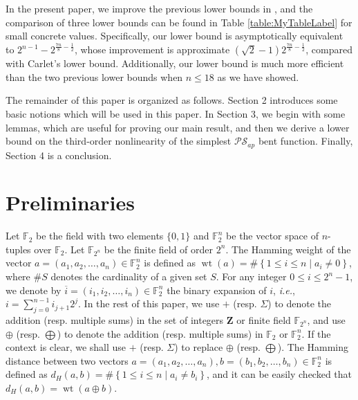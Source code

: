 \documentclass{article}
\newcommand{\Z}{\mathbf{Z}}
\newcommand{\F}{\mathbb{F}}
\newcommand{\0}{\textbf{0}}
\newcommand{\1}{\textbf{1}}
\newcommand{\wt}{\operatorname{wt}}
\theoremstyle{plain}
\begin{document}
    In the present paper, 
    we improve the previous lower bounds in \cite{TangCT2013NL_2bent,Carlet2011NL_Profile_Dillon}, and the comparison of three lower bounds can be found in Table \ref{table:MyTableLabel} for small concrete values.
    Specifically, our lower bound is asymptotically equivalent to $2^{n-1}-2^{\frac{7n}{8}-\frac{1}{2}}$, whose
    improvement is approximate $(\sqrt{2}-1)2^{\frac{7n}{8}-\frac{1}{2}}$, compared with Carlet's lower bound.
    Additionally, our lower bound is much more efficient than the two previous lower bounds when $n\le 18$ as we have showed.
    
    The remainder of this paper is organized as follows.
    Section 2 introduces some basic notions which will be used in this paper.
    In Section 3, we begin with some lemmas, which are useful for proving our main result, and then we derive a lower bound on the third-order nonlinearity of the simplest $\mathcal{PS}_{ap}$ bent function.
    Finally, Section 4 is a conclusion.
    
\section{Preliminaries}
    Let $\F_2$ be the field with two elements $\{0,1\}$ and $\F_2^n$ be the vector space of $n$-tuples over $\F_2$.
    Let $\F_{2^n}$ be the finite field of order $2^n$.
    The Hamming weight of the vector $a=(a_1,a_2,\dots,a_n)\in\F_2^n$ is defined as $\wt(a)=\#\left\{ 1\le i\le n\mid a_i\ne 0 \right\}$, where $\#S$ denotes the cardinality of a given set $S$.
    For any integer $0\le i \le 2^n-1$, we denote by $\overline{i}=(i_1,i_2,\dots,i_n)\in\F_2^n$ the binary expansion of $i$, \emph{i.e.}, $i=\sum_{j=0}^{n-1}i_{j+1}2^j$.
    In the rest of this paper, we use $+$ (resp. $\Sigma$) to denote the addition (resp. multiple sums) in  the set of integers $\Z$ or finite field $\F_{2^n}$, and use $\oplus$ (resp. $\bigoplus$) to denote the addition (resp. multiple sums) in $\F_2$ or $\F_2^n$.
    If the context is clear, we shall use $+$ (resp. $\Sigma$) to replace $\oplus$ (resp. $\bigoplus$).
    The Hamming distance between two vectors $a=(a_1,a_2,\dots,a_n),b=(b_1,b_2,\dots,b_n)\in\F_2^n$ is defined as $d_H(a,b)=\#\left\{ 1\le i\le n\middle| a_i\ne b_i \right\}$, and it can be easily checked that $d_H(a,b)=\wt(a\oplus b)$.
\end{document}
